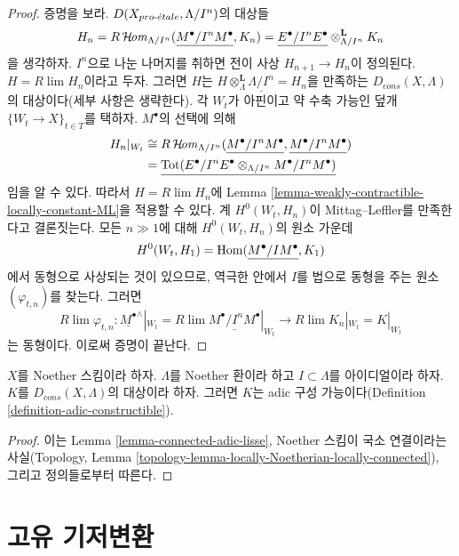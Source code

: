 \begin{proof}
증명을 보라. $D(X_{pro\text{-}\acute{e}tale}, \Lambda/I^n)$의 대상들
$$
H_n =
R\mathop{\mathcal{H}\!\mathit{om}}\nolimits_{\Lambda/I^n}(\underline{M^\bullet/I^nM^\bullet}, K_n) =
\underline{E^\bullet/I^nE^\bullet} \otimes_{\Lambda/I^n}^\mathbf{L} K_n
$$
을 생각하자. $I^n$으로 나눈 나머지를 취하면 전이 사상
$H_{n + 1} \to H_n$이 정의된다. $H = R\lim H_n$이라고 두자. 그러면
$H$는 $H \otimes_\Lambda^\mathbf{L} \underline{\Lambda/I^n} = H_n$을
만족하는 $D_{cons}(X, \Lambda)$의 대상이다(세부 사항은 생략한다).
각 $W_t$가 아핀이고 약 수축 가능인 덮개
$\{W_t \to X\}_{t \in T}$를 택하자. $M^\bullet$의 선택에 의해
\begin{align*}
H_n|_{W_t} & \cong 
R\mathop{\mathcal{H}\!\mathit{om}}\nolimits_{\Lambda/I^n}(\underline{M^\bullet/I^nM^\bullet},
\underline{M^\bullet/I^nM^\bullet}) \\
& =
\underline{
\text{Tot}(E^\bullet/I^nE^\bullet \otimes_{\Lambda/I^n} M^\bullet/I^nM^\bullet)
}
\end{align*}
임을 알 수 있다. 따라서 $H = R\lim H_n$에 Lemma
\ref{lemma-weakly-contractible-locally-constant-ML}을 적용할 수 있다.
계 $H^0(W_t, H_n)$이 Mittag--Leffler를 만족한다고 결론짓는다. 모든
$n \gg 1$에 대해 $H^0(W_t, H_n)$의 원소 가운데
$$
H^0(W_t, H_1) = \mathop{\mathrm{Hom}}\nolimits(\underline{M^\bullet/IM^\bullet}, K_1)
$$
에서 동형으로 사상되는 것이 있으므로, 역극한 안에서 $I$를 법으로
동형을 주는 원소 $(\varphi_{t, n})$를 찾는다. 그러면
$$
R\lim \varphi_{t, n} :
\underline{M^\bullet}^\wedge|_{W_t} =
R\lim \underline{M^\bullet/I^nM^\bullet}|_{W_t}
\longrightarrow
R\lim K_n|_{W_t} = K|_{W_t}
$$
는 동형이다. 이로써 증명이 끝난다.
\end{proof}

\begin{proposition}
\label{proposition-Noetherian-adic-constructible}
$X$를 Noether 스킴이라 하자. $\Lambda$를 Noether 환이라 하고
$I \subset \Lambda$를 아이디얼이라 하자. $K$를
$D_{cons}(X, \Lambda)$의 대상이라 하자. 그러면 $K$는 adic 구성
가능이다(Definition \ref{definition-adic-constructible}).
\end{proposition}

\begin{proof}
이는 Lemma \ref{lemma-connected-adic-lisse}, Noether 스킴이 국소
연결이라는 사실(Topology, Lemma
\ref{topology-lemma-locally-Noetherian-locally-connected}), 그리고
정의들로부터 따른다.
\end{proof}








\section{고유 기저변환}
\label{section-proper-base-change}

